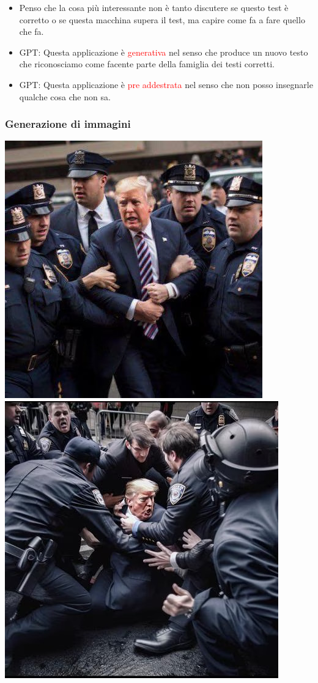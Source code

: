 \documentclass[xcolor=svgnames]{beamer}
\newcommand{\rosso}[1]{\textcolor{red}{#1}}
\renewcommand{\emph}{\rosso}
\begin{document}
\begin{frame}
\begin{itemize}
\item Penso che la cosa più interessante non è tanto discutere se questo test è corretto o se questa macchina supera il test, ma capire come fa a fare quello che fa.

\item GPT: Questa applicazione è \emph{generativa} nel senso che produce un nuovo testo che riconosciamo come facente parte della famiglia dei testi corretti.
\item GPT: Questa applicazione è \emph{pre addestrata} nel senso che non posso insegnarle qualche cosa che non sa.

\end{itemize}

\end{frame}

\begin{frame}[plain]\small\frametitle{Generazione di immagini}
  \includegraphics[width=.4\textwidth]{pictures/trump-1.jpg}  \hfill 
   \includegraphics[width=.4\textwidth]{pictures/trump-2.jpg}  
\end{frame}
\end{document}
